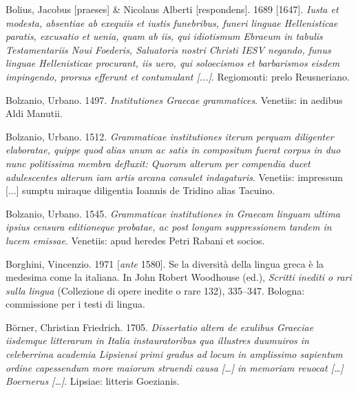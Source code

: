 \begin{styleStandard}
Bolius, Jacobus [praeses] \& Nicolaus Alberti [respondens]. 1689 [1647]. \textit{Iusta et modesta, absentiae ab exequiis et iustis funebribus, funeri linguae Hellenisticae paratis, excusatio et uenia, quam ab iis, qui idiotismum Ebraeum in tabulis Testamentariis Noui Foederis, Saluatoris nostri Christi IESV negando, funus linguae Hellenisticae procurant, iis uero, qui soloecismos et barbarismos eisdem impingendo, prorsus efferunt et contumulant [...]}. Regiomonti: prelo Reusneriano.
\end{styleStandard}

\begin{styleStandard}
Bolzanio, Urbano. 1497. \textit{Institutiones Graecae grammatices}. Venetiis: in aedibus Aldi Manutii.
\end{styleStandard}

\begin{styleStandard}
Bolzanio, Urbano. 1512. \textit{Grammaticae institutiones iterum perquam diligenter elaboratae, quippe quod alias unum ac satis in compositum fuerat corpus in duo nunc politissima membra defluxit: Quorum alterum per compendia ducet adulescentes alterum iam artis arcana consulet indagaturis}. Venetiis: impressum [...] sumptu miraque diligentia Ioannis de Tridino alias Tacuino.
\end{styleStandard}

\begin{styleStandard}
Bolzanio, Urbano. 1545. \textit{Grammaticae institutiones in Graecam linguam ultima ipsius censura editioneque probatae, ac post longam suppressionem tandem in lucem emissae}. Venetiis: apud heredes Petri Rabani et socios.
\end{styleStandard}

\begin{styleStandard}
Borghini, Vincenzio. 1971 [\textit{ante} 1580]. Se la diversità della lingua greca è la medesima come la italiana. In John Robert Woodhouse (ed.), \textit{Scritti inediti o rari sulla lingua} (Collezione di opere inedite o rare 132), 335–347. Bologna: commissione per i testi di lingua.
\end{styleStandard}

\begin{styleStandard}
Börner, Christian Friedrich. 1705. \textit{Dissertatio altera de exulibus Graeciae iisdemque litterarum in Italia instauratoribus qua illustres duumuiros in celeberrima academia Lipsiensi primi gradus ad locum in amplissimo sapientum ordine capessendum more maiorum struendi causa […] in memoriam reuocat […] Boernerus […]}. Lipsiae: litteris Goezianis.
\end{styleStandard}

